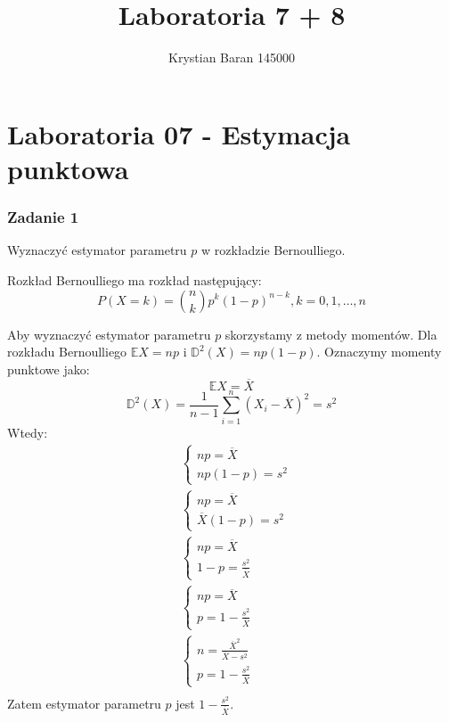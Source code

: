\documentclass{article}
\author{Krystian Baran 145000}
\title{Laboratoria 7 + 8}
\begin{document}
\maketitle
\newpage

\tableofcontents
\newpage

\part{Laboratoria 07 - Estymacja punktowa}

\section{Zadanie 1}
Wyznaczyć estymator parametru $p$ w rozkładzie Bernoulliego. \\ \par

Rozkład Bernoulliego ma rozkład następujący:
\[ P(X=k) = \binom{n}{k} p^k(1-p)^{n-k}, k = 0,1,\dots,n \]

Aby wyznaczyć estymator parametru $p$ skorzystamy z metody momentów. Dla rozkładu Bernoulliego $\mathbb{E}X = np$ i $\mathbb{D}^2(X) = np(1-p)$. Oznaczymy momenty punktowe jako:
\[ \mathbb{E}X = \overline{X} \]
\[ \mathbb{D}^2(X) = \frac{1}{n-1}\sum_{i=1}^n(X_i-\overline{X})^2 = s^2\]
Wtedy:
\begin{align*}
&\left\{
\begin{array}{l} np = \overline{X} \\ np(1-p) = s^2 \end{array} \right. \\ %
&\left\{
\begin{array}{l} np = \overline{X} \\ \overline{X}(1-p) = s^2 \end{array} \right. \\ %
&\left\{
\begin{array}{l} np = \overline{X} \\ 1-p = \frac{s^2}{\overline{X}} \end{array} \right. \\ %
&\left\{
\begin{array}{l} np = \overline{X} \\ p =1 - \frac{s^2}{\overline{X}} \end{array} \right. \\ %
&\left\{
\begin{array}{l} n = \frac{\overline{X}^2}{\overline{X}-s^2} \\ p = 1 - \frac{s^2}{\overline{X}} \end{array} \right. \\ %
\end{align*}
Zatem estymator parametru $p$ jest $1 - \frac{s^2}{\overline{X}}$.
\end{document}
